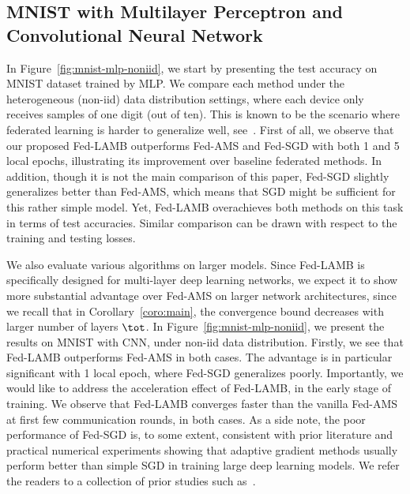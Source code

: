 \documentclass[11pt]{article}
\begin{document}
\subsection{MNIST with Multilayer Perceptron and Convolutional Neural Network}

In Figure~\ref{fig:mnist-mlp-noniid}, we start by presenting the test accuracy on MNIST dataset trained by MLP. 
We compare each method under the heterogeneous (non-iid) data distribution settings, where each device only receives samples of one digit (out of ten). 
This is known to be the scenario where federated learning is harder to generalize well, see~\citep{mcmahan2017communication}. 
First of all, we observe that our proposed Fed-LAMB outperforms Fed-AMS and Fed-SGD with both 1 and 5 local epochs, illustrating its improvement over baseline federated methods. 
In addition, though it is not the main comparison of this paper, Fed-SGD slightly generalizes better than Fed-AMS, which means that SGD might be sufficient for this rather simple model. 
Yet, Fed-LAMB overachieves both methods on this task in terms of test accuracies.
Similar comparison can be drawn with respect to the training and testing losses.



We also evaluate various algorithms on larger models. 
Since Fed-LAMB is specifically designed for multi-layer deep learning networks, we expect it to show more substantial advantage over Fed-AMS on larger network architectures, since we recall that in Corollary~\ref{coro:main}, the convergence bound decreases with larger number of layers $\tot$.
In Figure~\ref{fig:mnist-mlp-noniid}, we present the results on MNIST with CNN, under non-iid data distribution. Firstly, we see that Fed-LAMB outperforms Fed-AMS in both cases. The advantage is in particular significant with 1 local epoch, where Fed-SGD generalizes poorly. Importantly, we would like to address the acceleration effect of Fed-LAMB, in the early stage of training. We observe that Fed-LAMB converges faster than the vanilla Fed-AMS at first few communication rounds, in both cases. 
As a side note, the poor performance of Fed-SGD is, to some extent, consistent with prior literature and practical numerical experiments showing that adaptive gradient methods usually perform better than simple SGD in training large deep learning models. We refer the readers to a collection of prior studies such as~\citep{chen2020toward,reddi2020adaptive}. 
\end{document}

